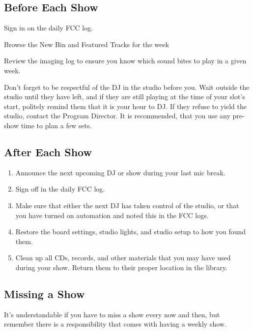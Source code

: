\documentclass{witrman}
\begin{document}
\subsection{Before Each Show}
\begin{tightenumerate}
    \item Sign in on the daily FCC log.
    \item Browse the New Bin and Featured Tracks for the week
    \item Review the imaging log to ensure you know which sound bites to play in
        a given week.
\end{tightenumerate}

Don't forget to be respectful of the DJ in the studio before you.  Wait outside
the studio until they have left, and if they are still playing at the time of
your slot's start, politely remind them that it is your hour to DJ\@.  If they
refuse to yield the studio, contact the Program Director.  It is recommended,
that you use any pre-show time to plan a few sets.

\subsection{After Each Show}
\begin{enumerate}
    \item Announce the next upcoming DJ or show during your last mic break.
    \item Sign off in the daily FCC log.
    \item Make sure that either the next DJ has taken control of the studio, or
        that you have turned on automation and noted this in the FCC logs.
    \item Restore the board settings, studio lights, and studio setup to how you
        found them.
    \item Clean up all CDs, records, and other materials that you may have used
        during your show.  Return them to their proper location in the library.
\end{enumerate}

\subsection{Missing a Show}

It's understandable if you have to miss a show every now and then, but remember
there is a responsibility that comes with having a weekly show.
\end{document}

